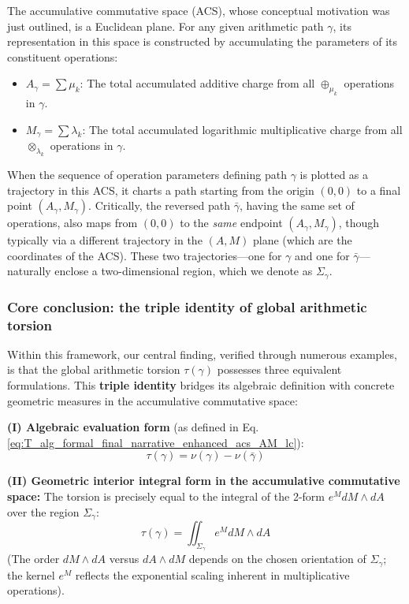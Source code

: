 The accumulative commutative space (ACS), whose conceptual motivation was just outlined, is a Euclidean plane. For any given arithmetic path $\gamma$, its representation in this space is constructed by accumulating the parameters of its constituent operations:
\begin{itemize}
    \item $A_\gamma = \sum \mu_k$: The total accumulated additive charge from all $\oplus_{\mu_k}$ operations in $\gamma$.
    \item $M_\gamma = \sum \lambda_k$: The total accumulated logarithmic multiplicative charge from all $\otimes_{\lambda_k}$ operations in $\gamma$.
\end{itemize}
When the sequence of operation parameters defining path $\gamma$ is plotted as a trajectory in this ACS, it charts a path starting from the origin $(0,0)$ to a final point $(A_\gamma, M_\gamma)$. Critically, the reversed path $\bar{\gamma}$, having the same set of operations, also maps from $(0,0)$ to the \textit{same} endpoint $(A_\gamma, M_\gamma)$, though typically via a different trajectory in the $(A,M)$ plane (which are the coordinates of the ACS). These two trajectories---one for $\gamma$ and one for $\bar{\gamma}$---naturally enclose a two-dimensional region, which we denote as $\Sigma_\gamma$.

\subsubsection*{Core conclusion: the triple identity of global arithmetic torsion}

Within this framework, our central finding, verified through numerous examples, is that the global arithmetic torsion $\tau(\gamma)$ possesses three equivalent formulations. This \textbf{triple identity} bridges its algebraic definition with concrete geometric measures in the accumulative commutative space:

\textbf{(I) Algebraic evaluation form} (as defined in Eq. \ref{eq:T_alg_formal_final_narrative_enhanced_acs_AM_lc}):
\[ \tau(\gamma) = \nu(\gamma) - \nu(\bar{\gamma}) \]

\textbf{(II) Geometric interior integral form in the accumulative commutative space:}
The torsion is precisely equal to the integral of the 2-form $e^M dM \wedge dA$ over the region $\Sigma_\gamma$:
\[ \tau(\gamma) = \iint_{\Sigma_\gamma} e^M dM \wedge dA \]
(The order $dM \wedge dA$ versus $dA \wedge dM$ depends on the chosen orientation of $\Sigma_\gamma$; the kernel $e^M$ reflects the exponential scaling inherent in multiplicative operations).

